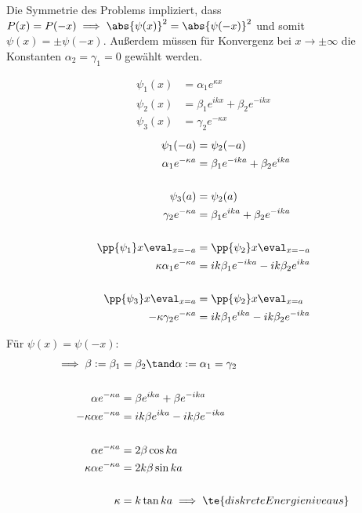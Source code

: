 \documentclass[ex]{exercise_3.0}
\begin{document}
\dottedlinett

Die Symmetrie des Problems impliziert, dass \(P(x)= P(-x) \implies \abs{\psi(x)}^2=\abs{\psi(-x)}^2\) und somit 
\(\psi(x) = \pm\psi(-x)\). 
Außerdem müssen für Konvergenz bei \(x\to \pm\infty\) die Konstanten \(\alpha_2=\gamma_1=0\) gewählt werden.

\begin{align*}
    \psi_1 (x) &= \alpha_1 e^{\kappa x}\\
    \psi_2 (x) &= \beta_1 e^{i k x} + \beta_2 e^{-i k x}\\
    \psi_3 (x) &= \gamma_2 e^{-\kappa x}
\end{align*}
\begin{align*}
    \psi_1(-a) &= \psi_2(-a)\\
    \alpha_1 e^{-\kappa a} &= \beta_1 e^{- i k a} + \beta_2 e^{i k a}\\
    \\
    \psi_3(a) &= \psi_2(a)\\
    \gamma_2 e^{-\kappa a} &= \beta_1 e^{i k a} + \beta_2 e^{-i k a}\\
    \\
    \pp{\psi_1}x\eval_{x=-a} &= \pp{\psi_{2}}x\eval_{x=-a}\\
    \kappa \alpha_1 e^{-\kappa a} &= ik \beta_1 e^{- i k a} - ik \beta_2 e^{i k a}\\
    \\
    \pp{\psi_3}x\eval_{x=a} &= \pp{\psi_{2}}x\eval_{x=a}\\
    -\kappa \gamma_2 e^{-\kappa a} &= ik \beta_1 e^{i k a} - ik \beta_2 e^{-i k a}\\
\end{align*}

Für \(\psi(x)=\psi(-x)\):
\begin{align*}
    \implies \beta:=\beta_1&=\beta_2\tand \alpha:=\alpha_1= \gamma_2\\
    \\
    \alpha e^{-\kappa a} &= \beta e^{i k a} + \beta e^{-i k a}\\
    -\kappa \alpha e^{-\kappa a} &= ik \beta e^{i k a} - ik \beta e^{- i k a}\\
    \\
    \alpha e^{-\kappa a} &= 2\beta \cos ka\\
    \kappa \alpha e^{-\kappa a} &= 2k\beta  \sin ka\\
    \\
    \kappa &= k \tan ka\implies \te{diskrete Energieniveaus}\\
\end{align*}
\end{document}
